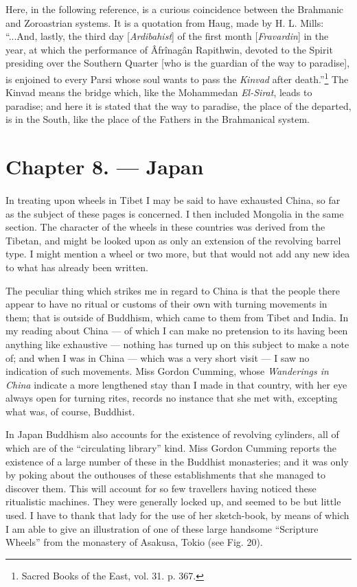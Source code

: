 \documentclass[a4paper, 11pt, oneside, polutonikogreek, english]{article}
\begin{document}
Here, in the following reference, is a curious coincidence between the Brahmanic and Zoroastrian systems. It is a quotation from Haug, made by H. L. Mills: ``...And, lastly, the third day [\emph{Ardibahist}] of the first month [\emph{Fravardin}] in the year, at which the performance of Âfrînagân Rapithwin, devoted to the Spirit presiding over the Southern Quarter [who is the guardian of the way to paradise], is enjoined to every Parsi whose soul wants to pass the \emph{Kinvad} after death.''\footnote{Sacred Books of the East, vol. 31. p. 367.} The Kinvad means the bridge which, like the Mohammedan \emph{El-Sirat}, leads to paradise; and here it is stated that the way to paradise, the place of the departed, is in the South, like the place of the Fathers in the Brahmanical system.
\clearpage
\section{Chapter 8. --- Japan}
\paragraph{}
In treating upon wheels in Tibet I may be said to have exhausted China, so far as the subject of these pages is concerned. I then included Mongolia in the same section. The character of the wheels in these countries was derived from the Tibetan, and might be looked upon as only an extension of the revolving barrel type. I might mention a wheel or two more, but that would not add any new idea to what has already been written.

The peculiar thing which strikes me in regard to China is that the people there appear to have no ritual or customs of their own with turning movements in them; that is outside of Buddhism, which came to them from Tibet and India. In my reading about China --- of which I can make no pretension to its having been anything like exhaustive --- nothing has turned up on this subject to make a note of; and when I was in China --- which was a very short visit --- I saw no indication of such movements. Miss Gordon Cumming, whose \emph{Wanderings in China} indicate a more lengthened stay than I made in that country, with her eye always open for turning rites, records no instance that she met with, excepting what was, of course, Buddhist.

In Japan Buddhism also accounts for the existence of revolving cylinders, all of which are of the ``circulating library'' kind. Miss Gordon Cumming reports the existence of a large number of these in the Buddhist monasteries; and it was only by poking about the outhouses of these establishments that she managed to discover them. This will account for so few travellers having noticed these ritualistic machines. They were generally locked up, and seemed to be but little used. I have to thank that lady for the use of her sketch-book, by means of which I am able to give an illustration of one of these large handsome ``Scripture Wheels'' from the monastery of Asakusa, Tokio (see Fig. 20).
\end{document}
